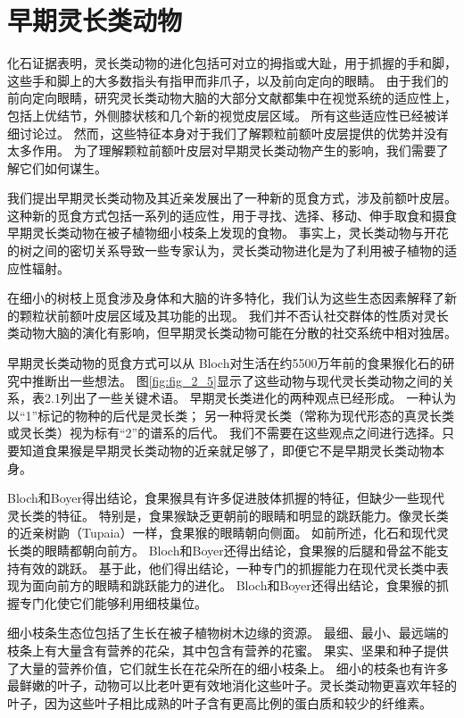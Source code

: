 \section{早期灵长类动物}
化石证据表明，灵长类动物的进化包括可对立的拇指或大趾，用于抓握的手和脚，这些手和脚上的大多数指头有指甲而非爪子，以及前向定向的眼睛\cite{fleagle2013primate,rose2006beginning}。
由于我们的前向定向眼睛，研究灵长类动物大脑的大部分文献都集中在视觉系统的适应性上，包括上优结节，外侧膝状核和几个新的视觉皮层区域。
所有这些适应性已经被详细讨论过\cite{barton2004binocularity,kaas2020evolution,preuss2007evolutionary}。
然而，这些特征本身对于我们了解颗粒前额叶皮层提供的优势并没有太多作用。
为了理解颗粒前额叶皮层对早期灵长类动物产生的影响，我们需要了解它们如何谋生。


我们提出早期灵长类动物及其近亲发展出了一种新的觅食方式，涉及前额叶皮层。
这种新的觅食方式包括一系列的适应性，用于寻找、选择、移动、伸手取食和摄食早期灵长类动物在被子植物细小枝条上发现的食物。
事实上，灵长类动物与开花的树之间的密切关系导致一些专家认为，灵长类动物进化是为了利用被子植物的适应性辐射。


在细小的树枝上觅食涉及身体和大脑的许多特化，我们认为这些生态因素解释了新的颗粒状前额叶皮层区域及其功能的出现。
我们并不否认社交群体的性质对灵长类动物大脑的演化有影响\cite{dunbar2009social}，但早期灵长类动物可能在分散的社交系统中相对独居\cite{mueller2000origin}。


早期灵长类动物的觅食方式可以从 Bloch\cite{bloch2002grasping}对生活在约5500万年前的食果猴化石的研究中推断出一些想法。
图\ref{fig:fig_2_5}显示了这些动物与现代灵长类动物之间的关系，表2.1列出了一些关键术语。
早期灵长类进化的两种观点已经形成。
一种认为以“1”标记的物种的后代是灵长类；
另一种将灵长类（常称为现代形态的真灵长类或灵长类）视为标有“2”的谱系的后代。
我们不需要在这些观点之间进行选择。只要知道食果猴是早期灵长类动物的近亲就足够了，即便它不是早期灵长类动物本身。


Bloch和Boyer得出结论，食果猴具有许多促进肢体抓握的特征，但缺少一些现代灵长类的特征。
特别是，食果猴缺乏更朝前的眼睛和明显的跳跃能力。像灵长类的近亲树鼩（Tupaia）一样，食果猴的眼睛朝向侧面。
如前所述，化石和现代灵长类的眼睛都朝向前方。
Bloch和Boyer还得出结论，食果猴的后腿和骨盆不能支持有效的跳跃。
基于此，他们得出结论，一种专门的抓握能力在现代灵长类中表现为面向前方的眼睛和跳跃能力的进化。
Bloch和Boyer还得出结论，食果猴的抓握专门化使它们能够利用细枝巢位。


细小枝条生态位包括了生长在被子植物树木边缘的资源。
最细、最小、最远端的枝条上有大量含有营养的花朵，其中包含有营养的花蜜。
果实、坚果和种子提供了大量的营养价值，它们就生长在花朵所在的细小枝条上。
细小的枝条也有许多最鲜嫩的叶子，动物可以比老叶更有效地消化这些叶子。灵长类动物更喜欢年轻的叶子，因为这些叶子相比成熟的叶子含有更高比例的蛋白质和较少的纤维素。


